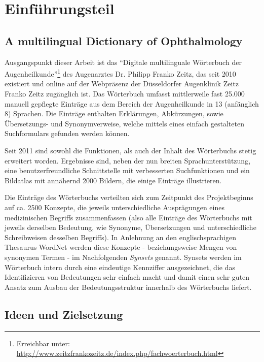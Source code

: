 \documentclass[pagesize,paper=A4,DIV=calc,fontsize=12pt,draft=false]{scrreprt}
\begin{document}
\tableofcontents

\chapter{Einführungsteil}

\section{A multilingual Dictionary of Ophthalmology}

Ausgangspunkt dieser Arbeit ist das \enquote{Digitale multilinguale Wörterbuch der Augenheilkunde}\footnote{Erreichbar unter: \href{http://www.zeitzfrankozeitz.de/index.php/fachwoerterbuch.html}{http://www.zeitzfrankozeitz.de/index.php/fachwoerterbuch.html}} des Augenarztes Dr. Philipp Franko Zeitz, das seit 2010 existiert und online auf der Webpräsenz der Düsseldorfer Augenklinik Zeitz Franko Zeitz zugänglich ist. 
Das Wörterbuch umfasst mittlerweile fast 25.000 manuell gepflegte Einträge aus dem Bereich der Augenheilkunde in 13 (anfänglich 8) Sprachen. 
Die Einträge enthalten Erklärungen, Abkürzungen, sowie Übersetzungs- und Synonymverweise, welche mittels eines einfach gestalteten Suchformulars gefunden werden können. 

Seit 2011 sind sowohl die Funktionen, als auch der Inhalt des Wörterbuchs stetig erweitert worden.
Ergebnisse sind, neben der nun breiten Sprachunterstützung, eine benutzerfreundliche Schnittstelle mit verbesserten Suchfunktionen und ein Bildatlas mit annähernd 2000 Bildern, die einige Einträge illustrieren. 

Die Einträge des Wörterbuchs verteilten sich zum Zeitpunkt des Projektbeginns auf ca. 2500 Konzepte, die jeweils unterschiedliche Ausprägungen eines medizinischen Begriffs zusammenfassen (also alle Einträge des Wörterbuchs mit jeweils derselben Bedeutung, wie Synonyme, Übersetzungen und unterschiedliche Schreibweisen desselben Begriffs). 
In Anlehnung an den englischsprachigen Thesaurus WordNet werden diese Konzepte - beziehungsweise Mengen von synonymen Termen - im Nachfolgenden \emph{Synsets} genannt. 
Synsets werden im Wörterbuch intern durch eine eindeutige Kennziffer ausgezeichnet, die das Identifizieren von Bedeutungen sehr einfach macht und damit einen sehr guten Ansatz zum Ausbau der Bedeutungsstruktur innerhalb des Wörterbuchs liefert.

\section{Ideen und Zielsetzung}
\end{document}
